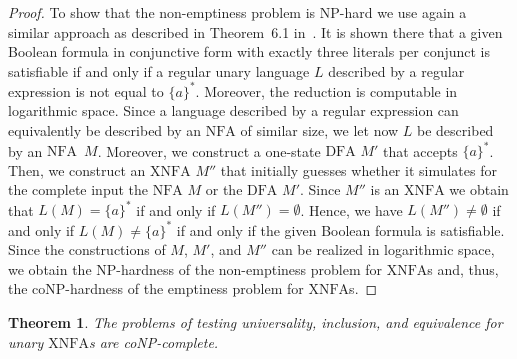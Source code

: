 \documentclass[final,copyright,noderivs]{eptcs}
\theoremstyle{plain}
\newtheorem{theorem}{Theorem}
\theoremstyle{definition}
\newcommand{\dfa}{\textrm{DFA}}
\newcommand{\nfa}{\textrm{NFA}}
\newcommand{\xnfa}{\textrm{XNFA}}
\begin{document}
\begin{proof}
To show that the non-emptiness problem is {\sf NP}-hard we use again a similar approach
as described in Theorem~6.1 in~\cite{Stockmeyer:1973:WPR}. It is shown there that a given Boolean formula
in conjunctive form with exactly three literals per conjunct is satisfiable if and only if a regular unary
language $L$ described by a regular expression is not equal to $\{a\}^*$. Moreover, the reduction is computable
in logarithmic space.
Since a language described by a regular expression can equivalently be described by an $\nfa$ of similar size,
we let now $L$ be described by an $\nfa$~$M$. Moreover, we construct a one-state $\dfa$ $M'$ that accepts $\{a\}^*$. 
Then, we construct an $\xnfa$ $M''$ that initially guesses whether it simulates for the complete input the 
$\nfa$ $M$ or the $\dfa$ $M'$. Since $M''$ is an $\xnfa$ we obtain that $L(M)=\{a\}^*$ if and only if $L(M'')=\emptyset$.
Hence, we have $L(M'') \neq \emptyset$ if and only if $L(M) \neq \{a\}^*$
if and only if the given Boolean formula is satisfiable.
Since the constructions of $M$, $M'$, and $M''$ can be realized in logarithmic space, we obtain the \textsf{NP}-hardness
of the non-emptiness problem for $\xnfa$s and, thus, the \textsf{coNP}-hardness of the emptiness problem for $\xnfa$s.
\end{proof}

\begin{theorem}\label{theo:compuniv:unary}
The problems of testing universality, 
inclusion, and equivalence for unary $\xnfa$s 
are {\em \textsf{coNP}}-complete.
\end{theorem}
\end{document}
